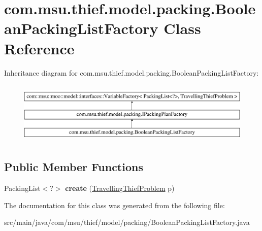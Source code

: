 \hypertarget{classcom_1_1msu_1_1thief_1_1model_1_1packing_1_1BooleanPackingListFactory}{\section{com.\-msu.\-thief.\-model.\-packing.\-Boolean\-Packing\-List\-Factory Class Reference}
\label{classcom_1_1msu_1_1thief_1_1model_1_1packing_1_1BooleanPackingListFactory}
}
Inheritance diagram for com.\-msu.\-thief.\-model.\-packing.\-Boolean\-Packing\-List\-Factory\-:\begin{figure}[H]
\begin{center}
\leavevmode
\includegraphics[height=3.000000cm]{classcom_1_1msu_1_1thief_1_1model_1_1packing_1_1BooleanPackingListFactory}
\end{center}
\end{figure}
\subsection*{Public Member Functions}
\begin{DoxyCompactItemize}
\item 
\hypertarget{classcom_1_1msu_1_1thief_1_1model_1_1packing_1_1BooleanPackingListFactory_ae8541200733c2198219f0d83d20a0f14}{Packing\-List$<$?$>$ {\bfseries create} (\hyperlink{classcom_1_1msu_1_1thief_1_1problems_1_1TravellingThiefProblem}{Travelling\-Thief\-Problem} p)}\label{classcom_1_1msu_1_1thief_1_1model_1_1packing_1_1BooleanPackingListFactory_ae8541200733c2198219f0d83d20a0f14}

\end{DoxyCompactItemize}


The documentation for this class was generated from the following file\-:\begin{DoxyCompactItemize}
\item 
src/main/java/com/msu/thief/model/packing/Boolean\-Packing\-List\-Factory.\-java\end{DoxyCompactItemize}
